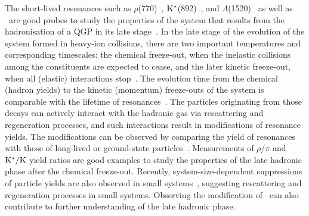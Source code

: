 The short-lived resonances such as $\rho$(770)~\cite{ALICE:2018qdv}, $\rm{}K^{*}$(892)~\cite{ALICE:2019etb, ALICE:2016sak}, and $\Lambda$(1520)~\cite{ALICE:2018ewo} as well as \fzero\ are good probes to study the properties of the system that results from the hadronisation of a QGP in its late stage~\cite{Bierlich:2021poz}. In the late stage of the evolution of the system formed in heavy-ion collisions, there are two important temperatures and corresponding timescales: the chemical freeze-out, when the inelastic collisions among the constituents are expected to cease, and the later kinetic freeze-out, when all (elastic) interactions stop~\cite{Song:1996ik}. The evolution time from the chemical (hadron yields) to the kinetic (momentum) freeze-outs of the system is comparable with the lifetime of resonances~\cite{ALICE:2011dyt, ALICE:2019xyr}. The particles originating from those decays can actively interact with the hadronic gas via rescattering and regeneration processes, and such interactions result in modifications of resonance yields. The modifications can be observed by comparing the yield of resonances with those of long-lived or ground-state particles~\cite{ALICE:2018pal}. Measurements of $\rho/\pi$ and $\rm{}K^{*}/K$ yield ratios are good examples to study the properties of the late hadronic phase after the chemical freeze-out. Recently, system-size-dependent suppressions of particle yields are also observed in small systems~\cite{ALICE:2019etb}, suggesting rescattering and regeneration processes in small systems. Observing the modification of \fzero~can also contribute to further understanding of the late hadronic phase.




 





